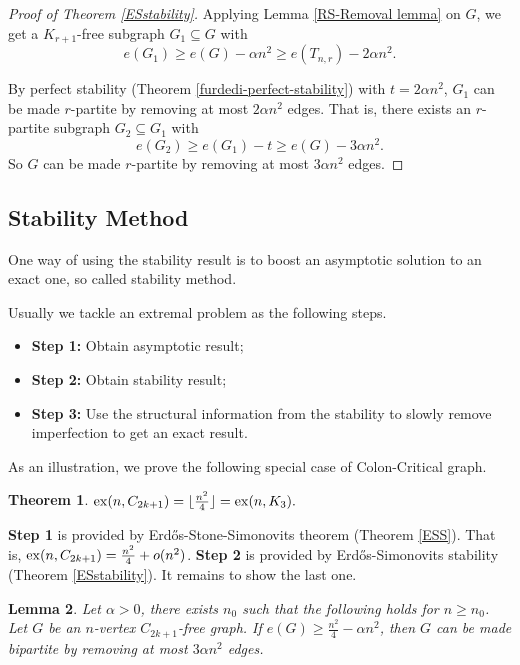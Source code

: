 \documentclass{article}
\newtheorem{theorem}{Theorem}[section]
\newtheorem{lemma}[theorem]{Lemma}
\theoremstyle{definition}
\def\Erdos{Erd\H{o}s}
\begin{document}
\begin{proof}[Proof of Theorem \ref{ESstability}]{}{}
    Applying Lemma \ref{RS-Removal lemma} on $G$, we get a $K_{r+1}$-free subgraph $G_1 \subseteq G$ with $$e(G_1)\geq e(G)-\alpha n^{2} \geq e(T_{n,r})-2\alpha n^{2}.$$

    By perfect stability (Theorem \ref{furdedi-perfect-stability}) with $t=2\alpha n^{2}$, $G_1$ can be made $r$-partite by removing at most $2\alpha n^{2}$ edges. That is, there exists an $r$-partite subgraph $G_2\subseteq G_1$ with $$e(G_2) \geq e(G_1) -t \geq e(G)-3\alpha n^{2}.$$ So $G$ can be made $r$-partite by removing at most $3\alpha n^{2}$ edges.
\end{proof}

\subsection{Stability Method}
One way of using the stability result is to boost an asymptotic solution to an exact one, so called stability method.

Usually we tackle an extremal problem as the following steps.
\begin{itemize}
    \item \textbf{Step 1:} Obtain asymptotic result;

    \item \textbf{Step 2:} Obtain stability result;

    \item \textbf{Step 3:} Use the structural information from the stability to slowly remove imperfection to get an exact result.
\end{itemize}

As an illustration, we prove the following special case of Colon-Critical graph.

\begin{theorem}{}{}\label{6-illustration}
    ${\rm ex}(n,C_{2k+1})=\lfloor\frac{n^2}{4}\rfloor = {\rm ex}(n,K_3).$
\end{theorem}

\textbf{Step 1} is provided by \Erdos{}-Stone-Simonovits theorem (Theorem \ref{ESS}). That is, ${\rm ex}(n,C_{2k+1})= \frac{n^2}{4} + o(n^2)$. \textbf{Step 2} is provided by \Erdos{}-Simonovits stability (Theorem \ref{ESstability}). It remains to show the last one.

\begin{lemma}
    Let $\alpha >0$, there exists $n_0$ such that the following holds for $n\geq n_0$.
    Let $G$ be an $n$-vertex $C_{2k+1}$-free graph. If $e(G)\geq \frac{n^2}{4}-\alpha n^2$, then $G$ can be made bipartite by removing at most $3\alpha n^2$ edges.
\end{lemma}
\end{document}
